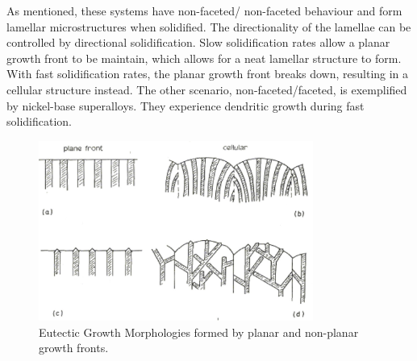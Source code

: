 %
As mentioned, these systems have non-faceted/ non-faceted behaviour and form lamellar microstructures when solidified. The directionality of the lamellae can be controlled by directional solidification. Slow solidification rates allow a planar growth front to be maintain, which allows for a neat lamellar structure to form. With fast solidification rates, the planar growth front breaks down, resulting in a cellular structure instead. The other scenario, non-faceted/faceted, is exemplified by nickel-base superalloys. They experience dendritic growth during fast solidification.
%
\begin{figure}[H]
\begin{center}
\includegraphics[width=9cm]{growthmorphologies}
\caption{Eutectic Growth Morphologies formed by planar and non-planar growth fronts.}
\label{fig:growthmorphologies}
\end{center}
\end{figure}
